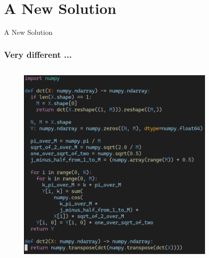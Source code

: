 \documentclass[dvipsnames, 10pt]{beamer}
\begin{document}
\section{A New Solution}
\begin{frame}
  \centering
  \Huge
  A New Solution
\end{frame}

\begin{frame}[fragile]
  \frametitle{Very different ...}
  \begin{columns}
    \begin{column}{0.5\textwidth}
      \begin{figure}
        \begin{center}
          \includegraphics[width=1.0\textwidth]{figures/solution/code-python.png}
        \end{center}
      \end{figure}
    \end{column}
    \begin{column}{0.5\textwidth}
      \begin{figure}
        \begin{center}

\end{center}
\end{figure}
\end{column}
\end{columns}
\end{frame}
\end{document}
